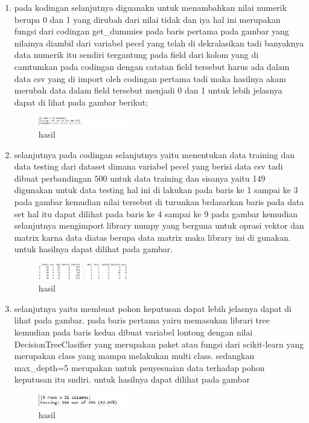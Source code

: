 \begin{enumerate}
\begin{figure}[H]
\end{figure}

\item pada kodingan selanjutnya diguanakn untuk menambahkan nilai numerik berupa 0 dan 1 yang dirubah dari nilai tidak dan iya hal ini merupakan fungsi dari codingan get\_dummies pada baris pertama pada gambar yang nilainya diambil dari variabel pecel yang telah di dekralasikan tadi banyaknya data numerik itu sendiri tergantung pada field dari kolom yang di camtumkan pada codingan dengan catatan field tersebut harus ada dalam data csv yang di import oleh codingan pertama tadi maka hasilnya akam merubah data dalam field tersebut menjadi 0 dan 1 untuk lebih jelasnya dapat di lihat pada gambar berikut; 

\begin{figure}[H]
\centering
\includegraphics[width= 4cm]{figures/1174039/chapter2/12.JPG}
\caption{hasil}

\end{figure}

\item selanjutnya pada codingan selanjutnya yaitu menentukan data training dan data testing dari dataset dimana variabel pecel yang berisi data csv tadi dibuat perbandingan 500 untuk data training dan sisanya yaitu 149 digunakan untuk data testing hal ini di lakukan pada baris ke 1 sampai ke 3 pada gambar kemudian nilai tersebut di turunkan  brdasarkan baris pada data set hal itu dapat dilihat pada baris ke 4 sampai ke 9 pada gambar kemudian selanjutnya mengimport library numpy yang berguna untuk oprasi vektor dan matrix karna data diatas berupa data matrix maka library ini di gunakan. untuk hasilnya dapat dilihat pada gambar.

\begin{figure}[H]
\centering
\includegraphics[width= 4cm]{figures/1174039/chapter2/13.JPG}
\caption{hasil}

\end{figure}

\item selanjutnya yaitu membuat pohon keputusan dapat lebih jelasnya dapat di lihat pada gambar. pada baris pertama yairu memasukan librari tree kemudian pada baris kedua dibuat variabel lontong dengan nilai DecisionTreeClasifier yang merupakan paket atau fungsi dari scikit-learn yang merupakan class yang mampu melakukan multi class. sedangkan max\_depth=5 merupakan untuk penyesuaian data terhadap pohon keputusan itu sndiri. untuk hasilnya dapat dilihat pada gambar

\begin{figure}[H]
\centering
\includegraphics[width= 4cm]{figures/1174039/chapter2/14.JPG}
\caption{hasil}


\end{figure}
\end{enumerate}
